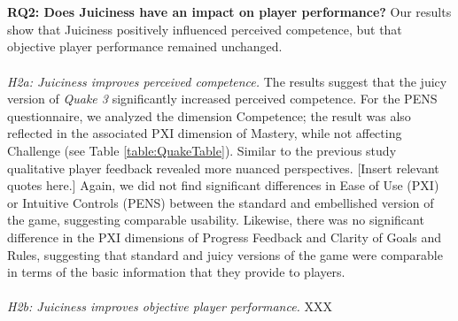 \documentclass{sigchi}
\begin{document}
\\\\
\textbf{RQ2: Does Juiciness have an impact on player performance?}
Our results show that Juiciness positively influenced perceived competence, but that objective player performance remained unchanged.
\\\\
\textit{H2a: Juiciness improves perceived competence.} The results suggest that the juicy version of \textit{Quake 3} significantly increased perceived competence. For the PENS questionnaire, we analyzed the dimension Competence; the result was also reflected in the associated PXI dimension of Mastery, while not affecting Challenge (see Table \ref{table:QuakeTable}). Similar to the previous study qualitative player feedback revealed more nuanced perspectives. [Insert relevant quotes here.] Again, we did not find significant differences in Ease of Use (PXI) or Intuitive Controls (PENS) between the standard and embellished version of the game, suggesting comparable usability. Likewise, there was no significant difference in the PXI dimensions of Progress Feedback and Clarity of Goals and Rules, suggesting that standard and juicy versions of the game were comparable in terms of the basic information that they provide to players. 
\\\\
\textit{H2b: Juiciness improves objective player performance.}
XXX
\end{document}
